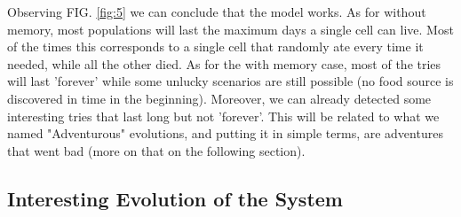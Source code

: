 \documentclass[a4paper,prd,twocolumn,nofootinbib,superscriptaddress,floatfix]{revtex4}
\begin{document}
Observing FIG. \ref{fig:5} we can conclude that the model works. As for without memory, most populations will last the maximum days a single cell can live. Most of the times this corresponds to a single cell that randomly ate every time it needed, while all the other died. As for the with memory case, most of the tries will last 'forever' while some unlucky scenarios are still possible (no food source is discovered in time in the beginning). Moreover, we can already detected some interesting tries that last long but not 'forever'. This will be related to what we named "Adventurous" evolutions, and putting it in simple terms, are adventures that went bad (more on that on the following section).

\subsection{Interesting Evolution of the System}
\end{document}

